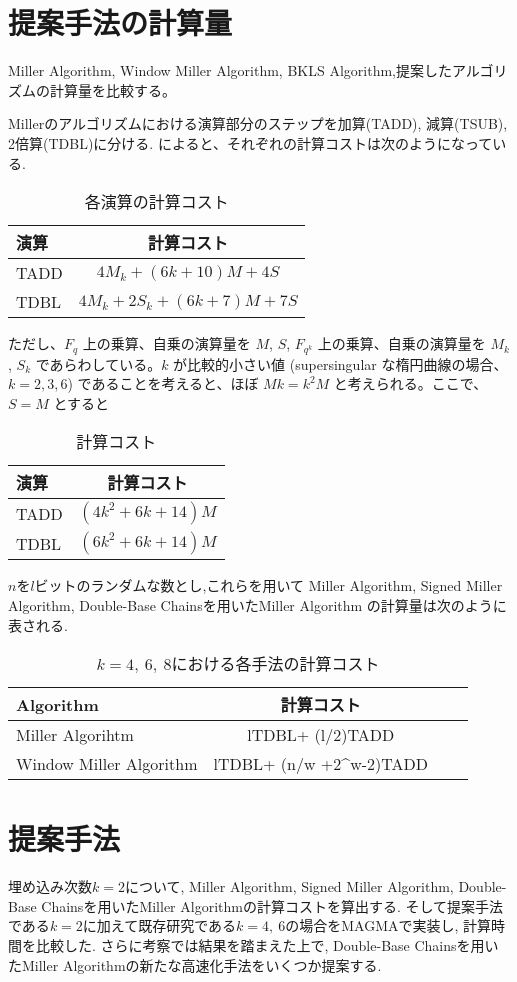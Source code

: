 \section{提案手法の計算量}
Miller Algorithm, Window Miller Algorithm, BKLS Algorithm,提案したアルゴリズムの計算量を比較する。
\par
Millerのアルゴリズムにおける演算部分のステップを加算(TADD), 減算(TSUB), 2倍算(TDBL)に分ける. \cite{TATE}によると、それぞれの計算コストは次のようになっている.
\begin{table}[htbp]
 \begin{center}
  \begin{tabular}{|l|c|}
  \hline
  演算 & 計算コスト \\
  \hline
  TADD & $4M_k + (6k+10)M + 4S$ \\
  \hline
  TDBL & $4M_k + 2S_k + (6k+7)M + 7S$ \\
  \hline
  \end{tabular}
 \end{center}
 \caption{各演算の計算コスト}
\end{table}
\par
ただし、$F_q$ 上の乗算、自乗の演算量を $M$, $S$, $F_{q^k}$ 上の乗算、自乗の演算量を $M_k$, $S_k$ であらわしている。$k$ が比較的小さい値 (supersingular な楕円曲線の場合、$k = 2, 3, 6$) であることを考えると、ほぼ $Mk = k^2M$ と考えられる。ここで、 $S = M$ とすると \\

\begin{table}[htbp]
\begin{center}
\begin{tabular}{|l|c|}
\hline
 演算 & 計算コスト\\
 \hline
 TADD & $(4k^2 + 6k + 14)M$ \\
 \hline
 TDBL & $(6k^2 + 6k + 14)M$ \\
 \hline
\end{tabular}
\end{center}
\caption{計算コスト}
\end{table}
\clearpage

$n$を$l$ビットのランダムな数とし,これらを用いて Miller Algorithm, Signed Miller Algorithm, Double-Base Chainsを用いたMiller Algorithm の計算量は次のように表される.
\begin{table}[htbp]
 \begin{center}
  \begin{tabular}{|l|c|c|c|}
  \hline
  Algorithm & 計算コスト \\
  \hline
  Miller Algorihtm & lTDBL+ (l/2)TADD \\
  \hline
  Window Miller Algorithm & lTDBL+ (n/w +2^w-2)TADD \\
  \hline
  \end{tabular}
 \end{center}
 \caption{$k=4,\ 6,\ 8$における各手法の計算コスト}
\end{table}
\section{提案手法}
埋め込み次数$k=2$について, Miller Algorithm, Signed Miller Algorithm, Double-Base Chainsを用いたMiller Algorithmの計算コストを算出する. そして提案手法である$k=2$に加えて既存研究である$k=4,\ 6$の場合をMAGMAで実装し, 計算時間を比較した. さらに考察では結果を踏まえた上で, Double-Base Chainsを用いたMiller Algorithmの新たな高速化手法をいくつか提案する.
